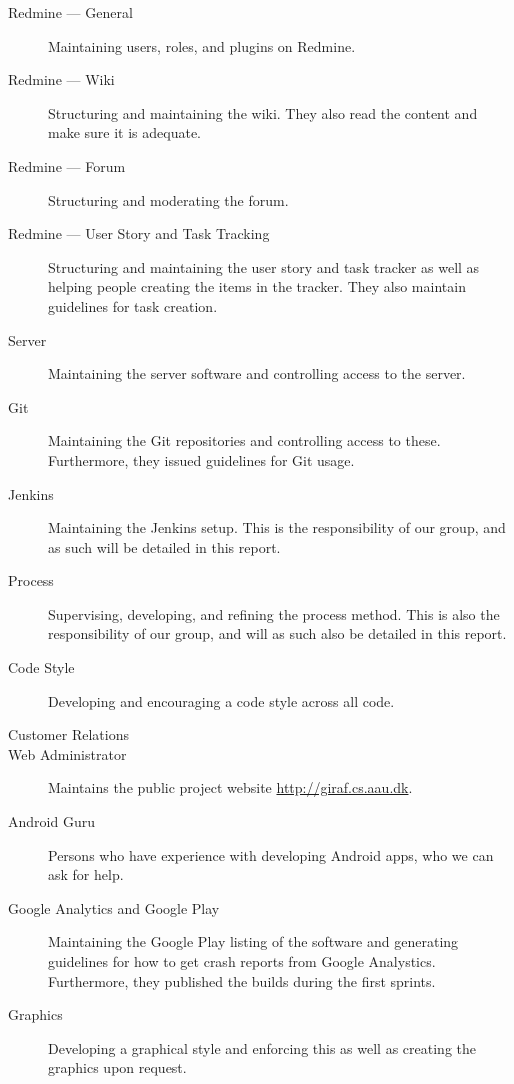 \begin{description}
  \item[Redmine --- General] Maintaining users, roles, and plugins on Redmine.
  \item[Redmine --- Wiki] Structuring and maintaining the wiki. They also read the content and make sure it is adequate.
  \item[Redmine --- Forum] Structuring and moderating the forum.
  \item[Redmine --- User Story and Task Tracking] Structuring and maintaining the user story and task tracker as well as helping people creating the items in the tracker. They also maintain guidelines for task creation.
  \item[Server] Maintaining the server software and controlling access to the server.
  \item[Git] Maintaining the Git repositories and controlling access to these. Furthermore, they issued guidelines for Git usage.
  \item[Jenkins] Maintaining the Jenkins setup. This is the responsibility of our group, and as such will be detailed in this report.
  \item[Process] Supervising, developing, and refining the process method. This is also the responsibility of our group, and will as such also be detailed in this report.
  \item[Code Style] Developing and encouraging a code style across all code.
  \item[Customer Relations] 
  \item[Web Administrator] Maintains the public project website \url{http://giraf.cs.aau.dk}.
  \item[Android Guru] Persons who have experience with developing Android apps, who we can ask for help.
  \item[Google Analytics and Google Play] Maintaining the Google Play listing of the software and generating guidelines for how to get crash reports from Google Analystics. Furthermore, they published the builds during the first sprints.
  \item[Graphics] Developing a graphical style and enforcing this as well as creating the graphics upon request.
\end{description}